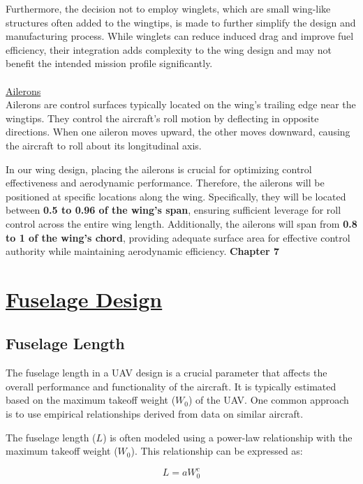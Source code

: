\documentclass[12 pt]{article}
\begin{document}
{Furthermore, the decision not to employ winglets, which are small wing-like structures often added to the wingtips, is made to further simplify the design and manufacturing process. While winglets can reduce induced drag and improve fuel efficiency, their integration adds complexity to the wing design and may not benefit the intended mission profile significantly.\\
\\ \vspace{5mm}
\color{red}
\large{\underline{Ailerons}}\\
\color{black}
Ailerons are control surfaces typically located on the wing's trailing edge near the wingtips. They control the aircraft's roll motion by deflecting in opposite directions. When one aileron moves upward, the other moves downward, causing the aircraft to roll about its longitudinal axis.

In our wing design, placing the ailerons is crucial for optimizing control effectiveness and aerodynamic performance. Therefore, the ailerons will be positioned at specific locations along the wing. Specifically, they will be located between \textbf{0.5 to 0.96 of the wing's span}, ensuring sufficient leverage for roll control across the entire wing length. Additionally, the ailerons will span from \textbf{0.8 to 1 of the wing's chord}, providing adequate surface area for effective control authority while maintaining aerodynamic efficiency.
\newpage
\textbf{\Huge{Chapter 7}}
\section{\underline{Fuselage Design}}
\color{red}
\subsection{Fuselage Length}
\color{black}
{The fuselage length in a UAV design is a crucial parameter that affects the overall performance and functionality of the aircraft. It is typically estimated based on the maximum takeoff weight (\(W_0\)) of the UAV. One common approach is to use empirical relationships derived from data on similar aircraft.}

{The fuselage length (\(L\)) is often modeled using a power-law relationship with the maximum takeoff weight (\(W_0\)). This relationship can be expressed as:}

\textbf{\[ L = a W_0^c \]}

}
\end{document}
